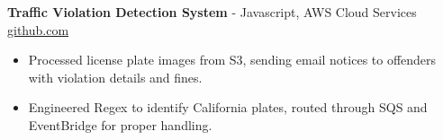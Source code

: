 \documentclass[11pt]{article}       %
\begin{document}

\textbf{Traffic Violation Detection System}{ - Javascript, AWS Cloud Services} \hfill \href{https://github.com/Monica20030707/AWS_rekonigition-N-read-database}{github.com} \\
\vspace{-9pt}
\begin{itemize}
  \item Processed license plate images from S3, sending email notices to offenders with violation details and fines.
  \item Engineered Regex to identify California plates, routed through SQS and EventBridge for proper handling.
\end{itemize}

\end{document}
